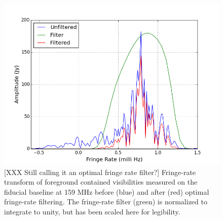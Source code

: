 \documentclass[twocolumn,numberedappendix]{emulateapj} \shorttitle{New Limits on the 21 cm Power Spectrum at $z=8.4$}
\begin{document}
\begin{figure}\centering
\includegraphics[width=\columnwidth]{plots/fr_preserved_signal.png}
\caption{
[XXX Still calling it an optimal fringe rate filter?]
Fringe-rate transform of foreground contained visibilities measured on the fiducial baseline at 159 MHz before (blue) and
after (red) optimal fringe-rate filtering. The fringe-rate filter (green) is normalized
to integrate to unity, but has been scaled here for legibility.
}
\label{fig:fr_preserved_signal}
\end{figure}
\end{document}
